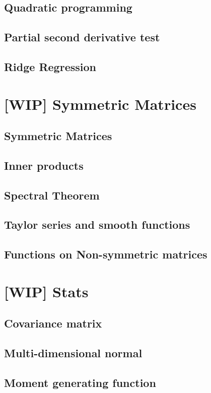 \documentclass{amsbook}
\begin{document}
\section{Quadratic programming}
\section{Partial second derivative test}
\section{Ridge Regression}

\chapter{[WIP] Symmetric Matrices}
\section{Symmetric Matrices}\label{SymmetricMatrices}
\section{Inner products}
\section{Spectral Theorem}
\section{Taylor series and smooth functions}\label{section_taylor_series}
\section{Functions on Non-symmetric matrices}

\chapter{[WIP] Stats}
\section{Covariance matrix}\label{Section-Covariance}
\section{Multi-dimensional normal}
\section{Moment generating function}
\end{document}
